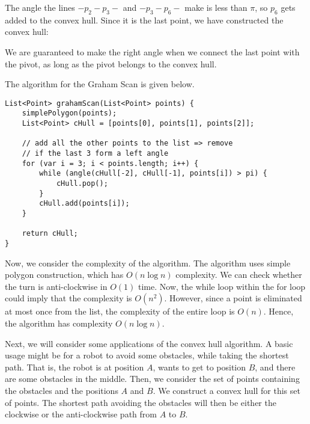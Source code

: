 \documentclass[a4paper, openany]{memoir}
\begin{document}
\noindent The angle the lines $-p_2-p_3-$ and $-p_3-p_6-$ make is less than $\pi$, so $p_6$ gets added to the convex hull. Since it is the last point, we have constructed the convex hull:
\begin{figure}[H]
    \centering
\end{figure}
\noindent We are guaranteed to make the right angle when we connect the last point with the pivot, as long as the pivot belongs to the convex hull.

The algorithm for the Graham Scan is given below.
\begin{lstlisting}[language=pseudocode]
List<Point> grahamScan(List<Point> points) {
    simplePolygon(points);
    List<Point> cHull = [points[0], points[1], points[2]];
    
    // add all the other points to the list => remove 
    // if the last 3 form a left angle
    for (var i = 3; i < points.length; i++) {
        while (angle(cHull[-2], cHull[-1], points[i]) > pi) {
            cHull.pop();
        }
        cHull.add(points[i]);
    }
    
    return cHull;
}
\end{lstlisting}

Now, we consider the complexity of the algorithm. The algorithm uses simple polygon construction, which has $O(n \log n)$ complexity. We can check whether the turn is anti-clockwise in $O(1)$ time. Now, the while loop within the for loop could imply that the complexity is $O(n^2)$. However, since a point is eliminated at most once from the list, the complexity of the entire loop is $O(n)$. Hence, the algorithm has complexity $O(n \log n)$.

Next, we will consider some applications of the convex hull algorithm. A basic usage might be for a robot to avoid some obstacles, while taking the shortest path. That is, the robot is at position $A$, wants to get to position $B$, and there are some obstacles in the middle. Then, we consider the set of points containing the obstacles and the positions $A$ and $B$. We construct a convex hull for this set of points. The shortest path avoiding the obstacles will then be either the clockwise or the anti-clockwise path from $A$ to $B$.
\end{document}
